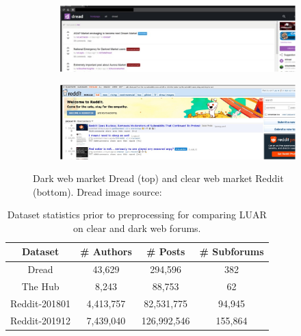 \begin{figure}
    \centering
    \begin{subfigure}{0.9\linewidth}
       \includegraphics[width=\textwidth,alt={Screenshot of Dread.}]{stylometryExtensions/figures/Dread} 
    \end{subfigure}
    \begin{subfigure}{0.9\linewidth}
       \includegraphics[width=\textwidth,alt={Screenshot of Reddit.}]{stylometryExtensions/figures/Reddit} 
    \end{subfigure}
    \caption{Dark web market Dread (top) and clear web market Reddit (bottom). Dread image source:~\citet{wiki:Dread}}
    \label{fig:stylometry_extensions:followingTrail:forums}
\end{figure}

\begin{table}
    \centering
    \begin{tabular}{cccc}
        \toprule
        Dataset &  \# Authors & \# Posts & \# Subforums\\
        \midrule
        Dread & 43,629 & 294,596 & 382 \\
        The Hub & 8,243 & 88,753 & 62 \\
        Reddit-201801 & 4,413,757 & 82,531,775 & 94,945 \\
        Reddit-201912 & 7,439,040 & 126,992,546 & 155,864 \\
        \bottomrule
    \end{tabular}
    \caption{Dataset statistics prior to preprocessing for comparing LUAR on clear and dark web forums.}
    \label{tab:stylometry_extensions:followingTrail:datasets}
\end{table}


